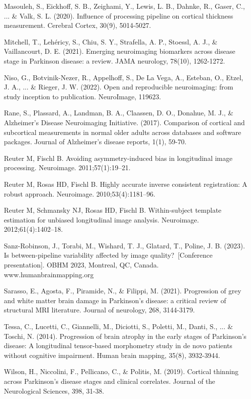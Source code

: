 Masouleh, S., Eickhoff, S. B., Zeighami, Y., Lewis, L. B., Dahnke, R., Gaser, C., ... \& Valk, S. L. (2020). Influence of processing pipeline on cortical thickness measurement. Cerebral Cortex, 30(9), 5014-5027.

Mitchell, T., Lehéricy, S., Chiu, S. Y., Strafella, A. P., Stoessl, A. J., \& Vaillancourt, D. E. (2021). Emerging neuroimaging biomarkers across disease stage in Parkinson disease: a review. JAMA neurology, 78(10), 1262-1272.

Niso, G., Botvinik-Nezer, R., Appelhoff, S., De La Vega, A., Esteban, O., Etzel, J. A., ... \& Rieger, J. W. (2022). Open and reproducible neuroimaging: from study inception to publication. NeuroImage, 119623.

Rane, S., Plassard, A., Landman, B. A., Claassen, D. O., Donahue, M. J., \& Alzheimer’s Disease Neuroimaging Initiative. (2017). Comparison of cortical and subcortical measurements in normal older adults across databases and software packages. Journal of Alzheimer's disease reports, 1(1), 59-70.

Reuter M, Fischl B. Avoiding asymmetry-induced bias in longitudinal image processing. Neuroimage. 2011;57(1):19–21.

Reuter M, Rosas HD, Fischl B. Highly accurate inverse consistent registration: A robust approach. Neuroimage. 2010;53(4):1181–96.

Reuter M, Schmansky NJ, Rosas HD, Fischl B. Within-subject template estimation for unbiased longitudinal image analysis. Neuroimage. 2012;61(4):1402–18.

Sanz-Robinson, J., Torabi, M., Wishard, T. J., Glatard, T., Poline, J. B. (2023). Is between-pipeline variability affected by image quality? [Conference presentation]. OBHM 2023, Montreal, QC, Canada. www.humanbrainmapping.org

Sarasso, E., Agosta, F., Piramide, N., \& Filippi, M. (2021). Progression of grey and white matter brain damage in Parkinson's disease: a critical review of structural MRI literature. Journal of neurology, 268, 3144-3179.

Tessa, C., Lucetti, C., Giannelli, M., Diciotti, S., Poletti, M., Danti, S., ... \& Toschi, N. (2014). Progression of brain atrophy in the early stages of Parkinson's disease: A longitudinal tensor‐based morphometry study in de novo patients without cognitive impairment. Human brain mapping, 35(8), 3932-3944.

Wilson, H., Niccolini, F., Pellicano, C., \& Politis, M. (2019). Cortical thinning across Parkinson's disease stages and clinical correlates. Journal of the Neurological Sciences, 398, 31-38.
